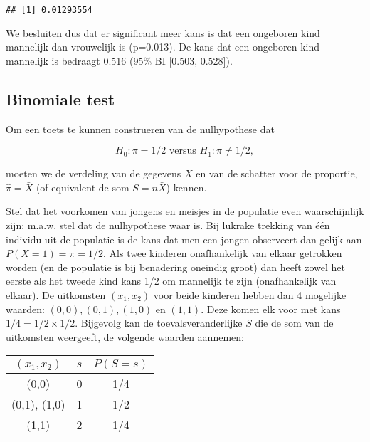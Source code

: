 \documentclass[
  12pt,dutch,coursenotes]{book}
\theoremstyle{definition}
\theoremstyle{definition}
\theoremstyle{definition}
\theoremstyle{remark}
\begin{document}
\begin{verbatim}
## [1] 0.01293554
\end{verbatim}

We besluiten dus dat er significant meer kans is dat een ongeboren kind mannelijk dan vrouwelijk is (p=0.013). De kans dat een ongeboren kind mannelijk is bedraagt 0.516 (95\% BI {[}0.503, 0.528{]}).

\hypertarget{subsec:binom}{%
\subsection{Binomiale test}\label{subsec:binom}}

Om een toets te kunnen construeren van de nulhypothese
dat

\[H_0: \pi=1/2 \text{ versus } H_1: \pi\neq 1/2,\]

moeten we de verdeling van de
gegevens \(X\) en van de schatter voor de proportie, \(\hat \pi = \bar X\) (of equivalent de som \(S=n\bar X\)) kennen.

Stel dat het voorkomen van jongens en meisjes in de populatie even waarschijnlijk zijn; m.a.w. stel dat de nulhypothese waar is. Bij lukrake trekking
van één individu uit de populatie is de kans dat men een jongen observeert dan gelijk aan \(P(X=1) = \pi = 1/2.\)
Als twee kinderen onafhankelijk van elkaar getrokken worden (en de populatie is bij benadering oneindig groot) dan heeft zowel
het eerste als het tweede kind kans 1/2 om mannelijk te zijn
(onafhankelijk van elkaar). De uitkomsten \((x_1, x_2)\) voor beide kinderen
hebben dan 4 mogelijke waarden: \((0,0), (0,1),(1,0)\) en \((1,1).\) Deze komen
elk voor met kans \(1/4 = 1/2 \times 1/2\). Bijgevolg kan de
toevalsveranderlijke \(S\) die de som van de uitkomsten weergeeft, de
volgende waarden aannemen:

\begin{longtable}[]{@{}ccc@{}}
\toprule
\((x_1,x_2)\) & \(s\) & \(P(S = s)\)\tabularnewline
\midrule
\endhead
(0,0) & 0 & 1/4\tabularnewline
(0,1), (1,0) & 1 & 1/2\tabularnewline
(1,1) & 2 & 1/4\tabularnewline
\bottomrule
\end{longtable}
\end{document}
